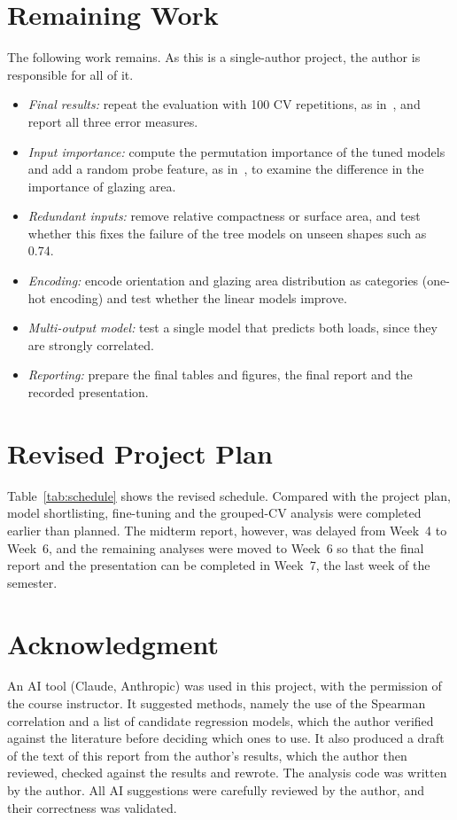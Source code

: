 \documentclass[journal]{IEEEtran}
\begin{document}
\section{Remaining Work}
The following work remains. As this is a single-author project, the author is responsible for all of it.
\begin{itemize}
\item \emph{Final results:} repeat the evaluation with 100 CV repetitions, as in~\cite{tsanas2012}, and
report all three error measures.
\item \emph{Input importance:} compute the permutation importance of the tuned models and add a random
probe feature, as in~\cite{tsanas2012}, to examine the difference in the importance of glazing area.
\item \emph{Redundant inputs:} remove relative compactness or surface area, and test whether this fixes the
failure of the tree models on unseen shapes such as 0.74.
\item \emph{Encoding:} encode orientation and glazing area distribution as categories (one-hot encoding)
and test whether the linear models improve.
\item \emph{Multi-output model:} test a single model that predicts both loads, since they are strongly
correlated.
\item \emph{Reporting:} prepare the final tables and figures, the final report and the recorded
presentation.
\end{itemize}

\section{Revised Project Plan}
Table~\ref{tab:schedule} shows the revised schedule. Compared with the project plan, model shortlisting,
fine-tuning and the grouped-CV analysis were completed earlier than planned. The midterm report, however,
was delayed from Week~4 to Week~6, and the remaining analyses were moved to Week~6 so that the final report
and the presentation can be completed in Week~7, the last week of the semester.


\section*{Acknowledgment}
An AI tool (Claude, Anthropic) was used in this project, with the permission of the course instructor.
It suggested methods, namely the use of the Spearman correlation and a list of candidate regression
models, which the author verified against the literature before deciding which ones to use. It also
produced a draft of the text of this report from the author's results, which the author then reviewed,
checked against the results and rewrote. The analysis code was written by the author. All AI suggestions
were carefully reviewed by the author, and their correctness was validated.
\end{document}
